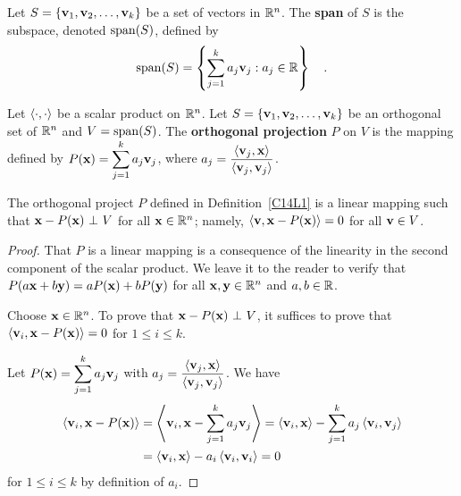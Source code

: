 \begin{defn}
Let $S = \{\mathbf{v}_1, \mathbf{v}_2, \ldots , \mathbf{v}_k\}$ be a set of
vectors in $\mathbb{R}^n$.  The {\bfseries span} of $S$
is the subspace, denoted $\operatorname{span}(S)$, defined by
\[
  \operatorname{span}(S) = \left\{ \sum_{j=1}^k a_j \mathbf{v}_j : a_j \in \mathbb{R} \right\} \quad .
\]
\end{defn}

\begin{defn}
Let $\left\langle{\cdot} , {\cdot}\right\rangle$ be a scalar product on $\mathbb{R}^n$.  Let
$S = \{\mathbf{v}_1, \mathbf{v}_2, \ldots , \mathbf{v}_k\}$ be an orthogonal
set of $\mathbb{R}^n$ and $V = \operatorname{span}(S)$.
The
{\bfseries orthogonal projection}
$P$ on $V$ is the mapping
defined by $P(\mathbf{x}) = \displaystyle \sum_{j=1}^k a_j \mathbf{v}_j$,
where
$\displaystyle a_j = \frac{\left\langle{\mathbf{v}_j} , {\mathbf{x}}\right\rangle}
{\left\langle{\mathbf{v}_j} , {\mathbf{v}_j}\right\rangle}$.
\label{C14L1}
\end{defn}

\begin{prop}
The orthogonal project $P$ defined in Definition~\ref{C14L1} is
a linear mapping such that $\mathbf{x} - P(\mathbf{x}) \operatorname{\,\bot\,} V$ for all
$\mathbf{x} \in \mathbb{R}^n$; namely, $\left\langle{\mathbf{v}} , {\mathbf{x} - P(\mathbf{x})}\right\rangle = 0$
for all $\mathbf{v} \in V$.
\end{prop}

\begin{proof}
That $P$ is a linear mapping is a consequence of the linearity in the
second component of the scalar product.  We leave it to the reader to
verify that $P(a\mathbf{x} + b\mathbf{y}) = a P(\mathbf{x}) + b P(\mathbf{y})$ for
all $\mathbf{x},\mathbf{y} \in \mathbb{R}^n$ and $a,b \in \mathbb{R}$.

Choose $\mathbf{x} \in \mathbb{R}^n$.  To prove that $\mathbf{x} - P(\mathbf{x}) \operatorname{\,\bot\,} V$,
it suffices to prove that $\left\langle{\mathbf{v}_i} , {\mathbf{x} - P(\mathbf{x})}\right\rangle = 0$ for
$1 \leq i \leq k$.

Let $\displaystyle P(\mathbf{x}) = \sum_{j=1}^k a_j \mathbf{v}_j$ with
$\displaystyle a_j = \frac{\left\langle{\mathbf{v}_j} , {\mathbf{x}}\right\rangle}
{\left\langle{\mathbf{v}_j} , {\mathbf{v}_j}\right\rangle}$.  We have
\begin{align*}
\left\langle{\mathbf{v}_i} , {\mathbf{x} - P(\mathbf{x})}\right\rangle &=
\left\langle{\mathbf{v}_i} , {\mathbf{x} - \sum_{j=1}^k a_j \mathbf{v}_j}\right\rangle
= \left\langle{\mathbf{v}_i} , {\mathbf{x}}\right\rangle - \sum_{j=1}^k a_j \left\langle{\mathbf{v}_i} , {\mathbf{v}_j}\right\rangle  \\
& = \left\langle{\mathbf{v}_i} , {\mathbf{x}}\right\rangle - a_i \left\langle{\mathbf{v}_i} , {\mathbf{v}_i}\right\rangle = 0
\end{align*}
for $1 \leq i \leq k$ by definition of $a_i$.
\end{proof}

